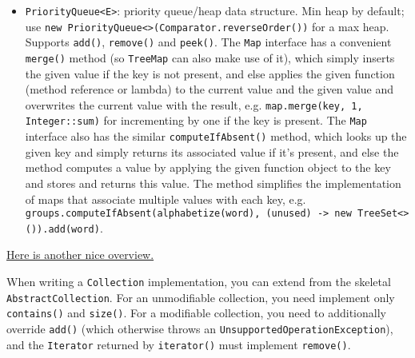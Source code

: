 \documentclass[8pt, table, xcdraw]{article}%
\begin{document}
\begin{itemize}
    \item \lstinline{PriorityQueue<E>}: priority queue/heap data structure. Min heap by default; use \lstinline{new PriorityQueue<>(Comparator.reverseOrder())} for a max heap. Supports \lstinline{add()}, \lstinline{remove()} and \lstinline{peek()}. The \lstinline{Map} interface has a convenient \lstinline{merge()} method (so \lstinline{TreeMap} can also make use of it), which simply inserts the given value if the key is not present, and else applies the given function (method reference or lambda) to the current value and the given value and overwrites the current value with the result, e.g. \lstinline{map.merge(key, 1, Integer::sum)} for incrementing by one if the key is present. The \lstinline{Map} interface also has the similar \lstinline{computeIfAbsent()} method, which looks up the given key and simply returns its associated value if it's present, and else the method computes a value by applying the given function object to the key and stores and returns this value. The method simplifies the implementation of maps that associate multiple values with each key, e.g. \lstinline{groups.computeIfAbsent(alphabetize(word), (unused) -> new TreeSet<>()).add(word)}.
\end{itemize}

\href{https://quickref.me/java.html#java-collections-framework}{Here is another nice overview.}

When writing a \lstinline{Collection} implementation, you can extend from the skeletal \lstinline{AbstractCollection}. For an unmodifiable collection, you need implement only \lstinline{contains()} and \lstinline{size()}. For a modifiable collection, you need to additionally override \lstinline{add()} (which otherwise throws an \lstinline{UnsupportedOperationException}), and the \lstinline{Iterator} returned by \lstinline{iterator()} must implement \lstinline{remove()}.
\end{document}
